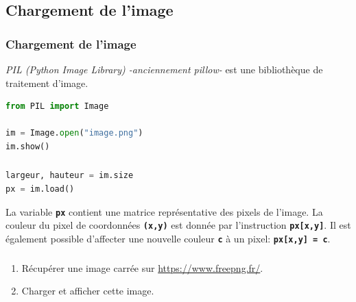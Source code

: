 \documentclass[svgnames,11pt]{beamer}
\begin{document}
\subsection{Chargement de l'image}
\begin{frame}[fragile]
    \frametitle{Chargement de l'image}

    \emph{PIL (Python Image Library) -anciennement pillow-} est une bibliothèque de traitement d'image.
    \begin{center}
        \begin{lstlisting}[language=Python , basicstyle=\ttfamily\small, xleftmargin=2em, xrightmargin=2em]
from PIL import Image

im = Image.open("image.png")
im.show()
\end{lstlisting}
        \label{CODE}
    \end{center}

\end{frame}
\begin{frame}[fragile]
    \frametitle{}

    \begin{center}
        \begin{lstlisting}[language=Python , basicstyle=\ttfamily\small, xleftmargin=2em, xrightmargin=2em]
largeur, hauteur = im.size
px = im.load()
\end{lstlisting}
        \label{CODE}
    \end{center}
    \begin{aretenir}[Information]
        La variable \textbf{\texttt{px}} contient une matrice représentative des pixels de l'image. La couleur du pixel de coordonnées \textbf{\texttt{(x,y)}} est donnée par l'instruction \texttt{\textbf{px[x,y]}}. Il est également possible d'affecter une nouvelle couleur \textbf{\texttt{c}} à un pixel: \texttt{\textbf{px[x,y] = c}}.
    \end{aretenir}
\end{frame}
\begin{frame}
    \frametitle{}

    \begin{activite}
        \begin{enumerate}
            \item Récupérer une image carrée sur \url{https://www.freepng.fr/}.
            \item Charger et afficher cette image.
        \end{enumerate}
    \end{activite}

\end{frame}
\end{document}
